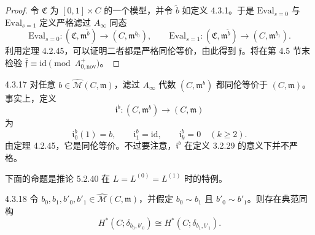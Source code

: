 \begin{proof}
令 $\mathfrak C$ 为 $[0,1]\times C$ 的一个模型，并令 $\widetilde b$
如定义 4.3.1。于是 $\mathrm{Eval}_{s=0}$ 与
$\mathrm{Eval}_{s=1}$ 定义严格滤过 $A_\infty$ 同态
\[
 \mathrm{Eval}_{s=0}\colon
 (\mathfrak C,\mathfrak m^{\widetilde b})
 \longrightarrow(C,\mathfrak m^{b_0}),
 \qquad
 \mathrm{Eval}_{s=1}\colon
 (\mathfrak C,\mathfrak m^{\widetilde b})
 \longrightarrow(C,\mathfrak m^{b_1}).
\]
利用定理 4.2.45，可以证明二者都是严格同伦等价，由此得到
$\mathfrak f$。将在第 4.5 节末检验
$\overline{\mathfrak f}\equiv\mathrm{id}\pmod{\Lambda^+_{0,\mathrm{nov}}}$。
\end{proof}

\begin{remark}{4.3.17}\label{rem:4-3-17}
对任意 $b\in\widehat{\mathcal M}(C,\mathfrak m)$，滤过
$A_\infty$ 代数 $(C,\mathfrak m^b)$ 都同伦等价于
$(C,\mathfrak m)$。事实上，定义
\[
 \mathfrak i^b\colon(C,\mathfrak m^b)\longrightarrow(C,\mathfrak m)
\]
为
\[
 \mathfrak i^b_0(1)=b,\qquad
 \mathfrak i^b_1=\mathrm{id},\qquad
 \mathfrak i^b_k=0\quad(k\geq2).
\]
由定理 4.2.45，它是同伦等价。不过要注意，$\mathfrak i^b$ 在定义
3.2.29 的意义下并不严格。
\end{remark}

下面的命题是推论 5.2.40 在 $L=L^{(0)}=L^{(1)}$ 时的特例。

\begin{proposition}{4.3.18}\label{prop:4-3-18}
令
$b_0,b_1,b'_0,b'_1\in\widehat{\mathcal M}(C,\mathfrak m)$，并假定
$b_0\sim b_1$ 且 $b'_0\sim b'_1$。则存在典范同构
\[
 H^*(C;\delta_{b_0,b'_0})
 \cong H^*(C;\delta_{b_1,b'_1}).
\]
\end{proposition}

